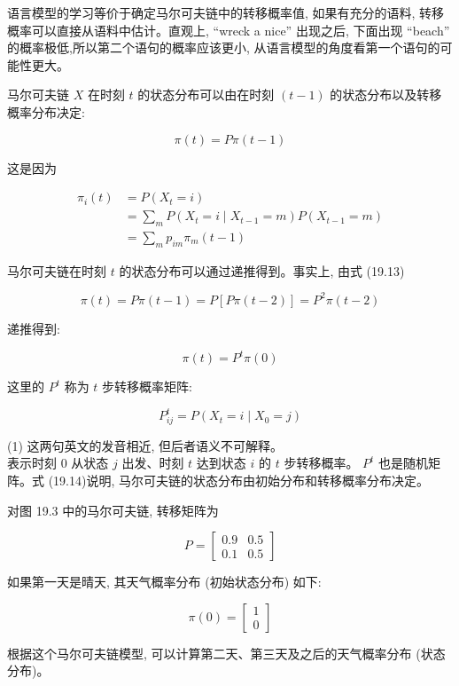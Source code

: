 \documentclass[10pt]{article}
\begin{document}
\begin{CJK*}{UTF8}{bsmi}
语言模型的学习等价于确定马尔可夫链中的转移概率值, 如果有充分的语料, 转移概率可以直接从语料中估计。直观上, “wreck a nice” 出现之后, 下面出现 “beach” 的概率极低,所以第二个语句的概率应该更小, 从语言模型的角度看第一个语句的可能性更大。

马尔可夫链 $X$ 在时刻 $t$ 的状态分布可以由在时刻 $(t-1)$ 的状态分布以及转移概率分布决定:


\begin{equation*}
\pi(t)=P \pi(t-1) \tag{19.13}
\end{equation*}


这是因为

$$
\begin{aligned}
\pi_{i}(t) & =P\left(X_{t}=i\right) \\
& =\sum_{m} P\left(X_{t}=i \mid X_{t-1}=m\right) P\left(X_{t-1}=m\right) \\
& =\sum_{m} p_{i m} \pi_{m}(t-1)
\end{aligned}
$$

马尔可夫链在时刻 $t$ 的状态分布可以通过递推得到。事实上, 由式 (19.13)

$$
\pi(t)=P \pi(t-1)=P[P \pi(t-2)]=P^{2} \pi(t-2)
$$

递推得到:


\begin{equation*}
\pi(t)=P^{t} \pi(0) \tag{19.14}
\end{equation*}


这里的 $P^{t}$ 称为 $t$ 步转移概率矩阵:

$$
P_{i j}^{t}=P\left(X_{t}=i \mid X_{0}=j\right)
$$

(1) 这两句英文的发音相近, 但后者语义不可解释。\\
表示时刻 0 从状态 $j$ 出发、时刻 $t$ 达到状态 $i$ 的 $t$ 步转移概率。 $P^{t}$ 也是随机矩阵。式 (19.14)说明, 马尔可夫链的状态分布由初始分布和转移概率分布决定。

对图 19.3 中的马尔可夫链, 转移矩阵为

$$
P=\left[\begin{array}{ll}
0.9 & 0.5 \\
0.1 & 0.5
\end{array}\right]
$$

如果第一天是晴天, 其天气概率分布 (初始状态分布) 如下:

$$
\pi(0)=\left[\begin{array}{l}
1 \\
0
\end{array}\right]
$$

根据这个马尔可夫链模型, 可以计算第二天、第三天及之后的天气概率分布 (状态分布)。


\end{CJK*}
\end{document}
